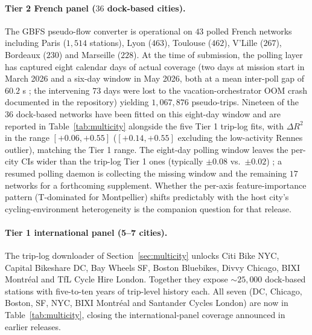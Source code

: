 \documentclass[11pt,a4paper]{article}
\begin{document}
\paragraph{Tier 2 French panel ($36$ dock-based cities).}
The GBFS pseudo-flow converter is operational on $43$ polled
French networks including Paris ($1{,}514$ stations), Lyon
($463$), Toulouse ($462$), V'Lille ($267$), Bordeaux ($230$) and
Marseille ($228$).  At the time of submission, the polling layer has
captured eight calendar days of actual coverage (two days at
mission start in March 2026 and a six-day window in May 2026,
both at a mean inter-poll gap of $60.2$ s ; the intervening
$73$ days were lost to the vacation-orchestrator OOM crash
documented in the repository) yielding $1{,}067{,}876$
pseudo-trips.  Nineteen of the $36$ dock-based networks have
been fitted on this eight-day window and are reported in
Table~\ref{tab:multicity} alongside the five Tier 1 trip-log
fits, with $\Delta R^2$ in the range $[+0.06, +0.55]$
($[+0.14, +0.55]$ excluding the low-activity Rennes outlier),
matching the Tier 1 range.  The eight-day polling window leaves
the per-city CIs wider than the trip-log Tier 1 ones (typically
$\pm 0.08$ vs.\ $\pm 0.02$) ; a resumed polling daemon is
collecting the missing window and the remaining $17$ networks for
a forthcoming supplement.  Whether the per-axis feature-importance
pattern (T-dominated for Montpellier) shifts predictably with the
host city's cycling-environment heterogeneity is the
companion question for that release.

\paragraph{Tier 1 international panel (5--7 cities).}
The trip-log downloader of Section~\ref{sec:multicity} unlocks
Citi Bike NYC, Capital Bikeshare DC, Bay Wheels SF, Boston
Bluebikes, Divvy Chicago, BIXI Montr\'eal and TfL Cycle Hire
London.  Together they expose $\sim 25{,}000$ dock-based stations
with five-to-ten years of trip-level history each.  All seven (DC, Chicago, Boston, SF, NYC, BIXI Montr\'eal and
Santander Cycles London) are now in Table~\ref{tab:multicity},
closing the international-panel coverage announced in earlier releases.
\end{document}
